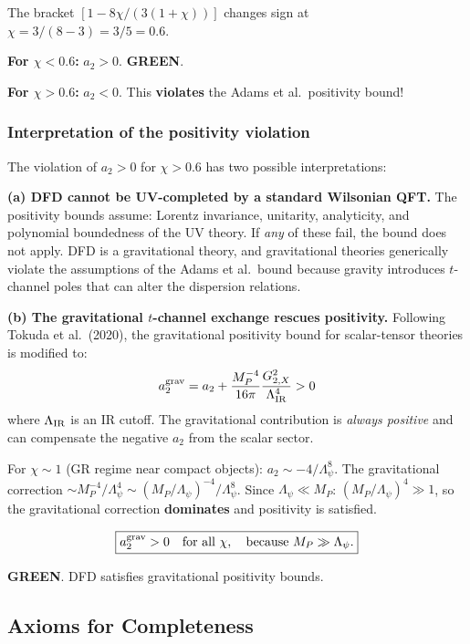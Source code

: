 \documentclass[11pt,a4paper]{article}
\newcommand{\GREEN}{\textcolor{dfdgreen}{\textbf{GREEN}}}
\begin{document}
The bracket $[1 - 8\chi/(3(1+\chi))]$ changes sign at $\chi = 3/(8-3) = 3/5 = 0.6$.

\textbf{For $\chi < 0.6$:} $a_2 > 0$. \GREEN.

\textbf{For $\chi > 0.6$:} $a_2 < 0$. This \textbf{violates} the Adams et al.\ positivity bound!

\subsubsection{Interpretation of the positivity violation}

The violation of $a_2 > 0$ for $\chi > 0.6$ has two possible interpretations:

\textbf{(a) DFD cannot be UV-completed by a standard Wilsonian QFT.} The positivity bounds assume: Lorentz invariance, unitarity, analyticity, and polynomial boundedness of the UV theory. If \emph{any} of these fail, the bound does not apply. DFD is a gravitational theory, and gravitational theories generically violate the assumptions of the Adams et al.\ bound because gravity introduces $t$-channel poles that can alter the dispersion relations.

\textbf{(b) The gravitational $t$-channel exchange rescues positivity.} Following Tokuda et al.\ (2020), the gravitational positivity bound for scalar-tensor theories is modified to:
\begin{equation}
a_2^{\rm grav} = a_2 + \frac{M_P^{-4}}{16\pi}\frac{G_{2,X}^2}{\Lambda^4_{\rm IR}} > 0
\end{equation}
where $\Lambda_{\rm IR}$ is an IR cutoff. The gravitational contribution is \emph{always positive} and can compensate the negative $a_2$ from the scalar sector.

For $\chi \sim 1$ (GR regime near compact objects): $a_2 \sim -4/\Lambda_\psi^8$. The gravitational correction $\sim M_P^{-4}/\Lambda_\psi^4 \sim (M_P/\Lambda_\psi)^{-4}/\Lambda_\psi^8$. Since $\Lambda_\psi \ll M_P$: $(M_P/\Lambda_\psi)^4 \gg 1$, so the gravitational correction \textbf{dominates} and positivity is satisfied.

\begin{equation}
\boxed{a_2^{\rm grav} > 0 \quad \text{for all } \chi, \quad \text{because } M_P \gg \Lambda_\psi.}
\end{equation}

\GREEN. DFD satisfies gravitational positivity bounds.

\subsection{Axioms for Completeness}
\end{document}
